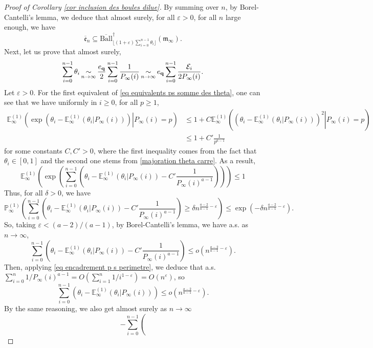 \documentclass[11pt]{article}
\numberwithin{equation}{section}
\def\vp{\varepsilon}
\def\E{\mathbb{E}}
\def\P{\mathbb{P}}
\begin{document}
\begin{proof}[Proof of Corollary \ref{cor inclusion des boules dilue}]
By summing over $n$, by Borel-Cantelli's lemma, we deduce that almost surely, for all $\vp>0$, for all $n$ large enough, we have 
$$
\overline{\mathfrak{e}}_n \subseteq \overline{\mathrm{Ball}}^\dagger_{\lfloor (1+\vp)
\sum_{i=0}^{n-1} \theta_i	
\rfloor}(\mathfrak{m}_\infty).
$$
Next, let us prove that almost surely,
\begin{equation}\label{eq equivalents ps somme des theta}
\sum_{i=0}^{n-1} \theta_i \mathop{\sim}\limits_{n \to \infty}
\frac{e_{\bf q}}{2}
\sum_{i=0}^{n-1} \frac{1}{P_\infty(i)}
\mathop{\sim}\limits_{n \to \infty}
e_{\bf q}
\sum_{i=0}^{n-1} \frac{\mathcal{E}_i}{2P_\infty(i)}.
\end{equation}
Let $\vp>0$. For the first equivalent of \eqref{eq equivalents ps somme des theta}, one can see that we have uniformly in $i \ge 0$, for all $p \ge 1$,
\begin{align*}
\E^{(1)}_\infty \left( \left.
\exp
\left(
\theta_i - \E^{(1)}_\infty (\theta_i \vert P_\infty(i))
\right)
\right\vert
P_\infty(i) =p
\right)
&\le 1 + 
C\E^{(1)}_\infty \left( \left.
\left(
\theta_i - \E^{(1)}_\infty (\theta_i \vert P_\infty(i))
\right)^2
\right\vert
P_\infty(i) 
=p
 \right)\\
 &\le 1+ C'\frac{1}{p^{a-1}}
\end{align*}
for some constants $C,C'>0$, where the first inequality comes from the fact that $\theta_i \in [0,1]$ and the second one stems from \eqref{majoration theta carre}. As a result, 
$$
\E^{(1)}_\infty\left(
\exp \left(
\sum_{i=0}^{n-1} \left(
\theta_i - \E^{(1)}_\infty(
\theta_i \vert P_\infty(i))
-C' \frac{1}{P_\infty(i)^{a-1}}
\right)
\right)
\right) \le 1
$$
Thus, for all $\delta>0$, we have
$$
\P^{(1)}_\infty
\left(
\sum_{i=0}^{n-1} \left(
\theta_i - \E^{(1)}_\infty(
\theta_i \vert P_\infty(i))
-C' \frac{1}{P_\infty(i)^{a-1}}
\right)
\ge
\delta n^{\frac{a-2}{a-1}-\vp}
\right)
\le  \exp\left( -\delta n^{\frac{a-2}{a-1}-\vp} \right).
$$
So, taking $\vp<(a-2)/(a-1)$, by Borel-Cantelli's lemma, we have a.s. as $n\to \infty$,
$$
\sum_{i=0}^{n-1} \left(
\theta_i - \E^{(1)}_\infty(
\theta_i \vert P_\infty(i))
-C' \frac{1}{P_\infty(i)^{a-1}}
\right)
\le
o\left(
n^{\frac{a-2}{a-1}-\vp} 
\right).
$$
Then, applying \eqref{eq encadrement p s perimetre}, we deduce that a.s.\@ $\sum_{i=0}^n 1/P_\infty(i)^{a-1}  = O (\sum_{i=1}^n 1/i^{1-\vp})=O(n^{\vp} )$, so
$$
\sum_{i=0}^{n-1} \left(
\theta_i - \E^{(1)}_\infty(
\theta_i \vert P_\infty(i))
\right)
\le
o\left(
n^{\frac{a-2}{a-1}-\vp} 
\right).
$$
By the same reasoning, we also get almost surely as $n \to \infty$
$$
-\sum_{i=0}^{n-1} \left(
$$
\end{proof}
\end{document}

